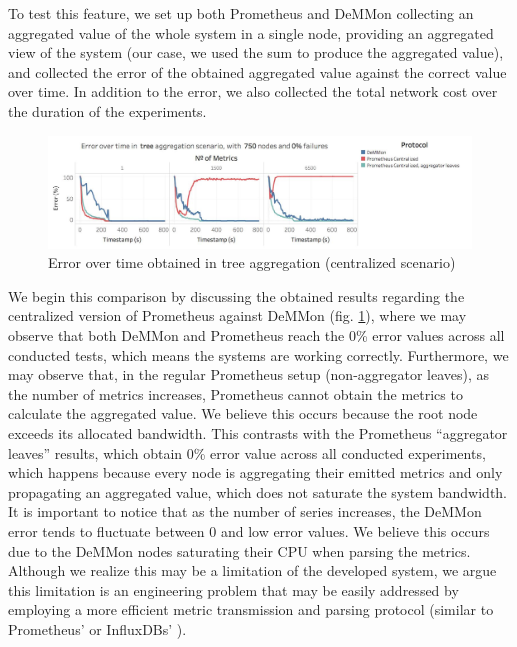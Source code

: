 To test this feature, we set up both Prometheus and DeMMon collecting an aggregated value of the whole system in a single node, providing an aggregated view of the system (our case, we used the sum to produce the aggregated value), and collected the error of the obtained aggregated value against the correct value over time. In addition to the error, we also collected the total network cost over the duration of the experiments. 

\begin{figure}
    \centering
    \includegraphics[width=\linewidth]{Chapters/evaluation/figures/aggregation/Error_over_time_tree_0_failures_centralized.jpg}
    \caption{Error over time obtained in tree aggregation (centralized scenario)}
    \label{fig:sec:mon_eval_tree_centralized}
\end{figure}

We begin this comparison by discussing the obtained results regarding the centralized version of Prometheus against DeMMon (fig. \ref{fig:sec:mon_eval_tree_centralized}), where we may observe that both DeMMon and Prometheus reach the 0\% error values across all conducted tests, which means the systems are working correctly. Furthermore, we may observe that, in the regular Prometheus setup (non-aggregator leaves), as the number of metrics increases, Prometheus cannot obtain the metrics to calculate the aggregated value. We believe this occurs because the root node exceeds its allocated bandwidth. This contrasts with the Prometheus ``aggregator leaves'' results, which obtain 0\% error value across all conducted experiments, which happens because every node is aggregating their emitted metrics and only propagating an aggregated value, which does not saturate the system bandwidth. It is important to notice that as the number of series increases, the DeMMon error tends to fluctuate between 0 and low error values. We believe this occurs due to the DeMMon nodes saturating their CPU when parsing the metrics. Although we realize this may be a limitation of the developed system, we argue this limitation is an engineering problem that may be easily addressed by employing a more efficient metric transmission and parsing protocol (similar to Prometheus' or InfluxDBs' \cite{influxdb_data_elements}).

